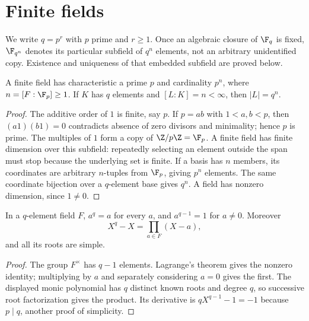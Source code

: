\chapter{Finite fields}\label{chap:M07.13}
We write $q=p^r$ with $p$ prime and $r\geq1$. Once an algebraic closure of $\F_q$ is fixed, $\F_{q^n}$ denotes its particular subfield of $q^n$ elements, not an arbitrary unidentified copy. Existence and uniqueness of that embedded subfield are proved below.

\begin{theorem}
A finite field has characteristic a prime $p$ and cardinality $p^n$, where $n=[F:\F_p]\geq1$. If $K$ has $q$ elements and $[L:K]=n<\infty$, then $|L|=q^n$.
\end{theorem}
\begin{proof}
The additive order of $1$ is finite, say $p$. If $p=ab$ with $1<a,b<p$, then $(a1)(b1)=0$ contradicts absence of zero divisors and minimality; hence $p$ is prime. The multiples of $1$ form a copy of $\Z/p\Z=\F_p$. A finite field has finite dimension over this subfield: repeatedly selecting an element outside the span must stop because the underlying set is finite. If a basis has $n$ members, its coordinates are arbitrary $n$-tuples from $\F_p$, giving $p^n$ elements. The same coordinate bijection over a $q$-element base gives $q^n$. A field has nonzero dimension, since $1\ne0$.
\end{proof}

\begin{theorem}
In a $q$-element field $F$, $a^q=a$ for every $a$, and $a^{q-1}=1$ for $a\ne0$. Moreover
\[X^q-X=\prod_{a\in F}(X-a),\]
and all its roots are simple.
\end{theorem}
\begin{proof}
The group $F^\times$ has $q-1$ elements. Lagrange's theorem gives the nonzero identity; multiplying by $a$ and separately considering $a=0$ gives the first. The displayed monic polynomial has $q$ distinct known roots and degree $q$, so successive root factorization gives the product. Its derivative is $qX^{q-1}-1=-1$ because $p\mid q$, another proof of simplicity.
\end{proof}

